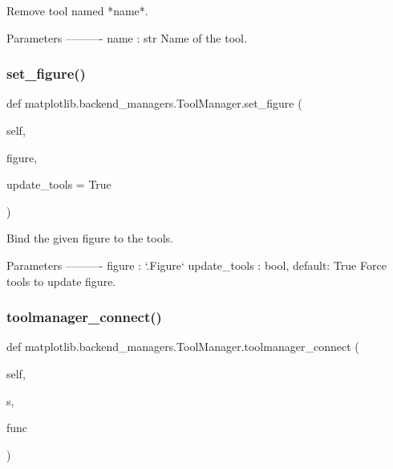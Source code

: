 \begin{DoxyVerb}Remove tool named *name*.

Parameters
----------
name : str
    Name of the tool.
\end{DoxyVerb}
 \mbox{\label{classmatplotlib_1_1backend__managers_1_1ToolManager_affec78f19af58a5c10f258f192a69a03}} 
\subsubsection{\texorpdfstring{set\+\_\+figure()}{set\_figure()}}
{\footnotesize\ttfamily def matplotlib.\+backend\+\_\+managers.\+Tool\+Manager.\+set\+\_\+figure (\begin{DoxyParamCaption}\item[{}]{self,  }\item[{}]{figure,  }\item[{}]{update\+\_\+tools = {\ttfamily True} }\end{DoxyParamCaption})}

\begin{DoxyVerb}Bind the given figure to the tools.

Parameters
----------
figure : `.Figure`
update_tools : bool, default: True
    Force tools to update figure.
\end{DoxyVerb}
 \mbox{\label{classmatplotlib_1_1backend__managers_1_1ToolManager_afd9e0a90709887a79d39e55834f90225}} 
\subsubsection{\texorpdfstring{toolmanager\+\_\+connect()}{toolmanager\_connect()}}
{\footnotesize\ttfamily def matplotlib.\+backend\+\_\+managers.\+Tool\+Manager.\+toolmanager\+\_\+connect (\begin{DoxyParamCaption}\item[{}]{self,  }\item[{}]{s,  }\item[{}]{func }\end{DoxyParamCaption})}

